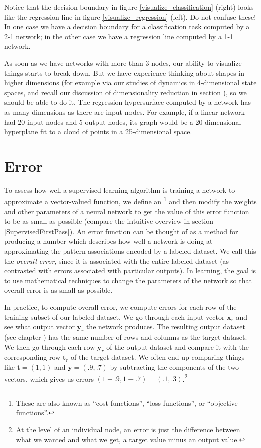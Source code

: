 Notice that the decision boundary in figure \ref{visualize_classification} (right) looks like the regression line in figure \ref{visualize_regression} (left). Do not confuse these! In one case we have a decision boundary for a classification task computed by a 2-1 network; in the other case we have a regression line computed by a 1-1 network.

As soon as we have networks with more than 3 nodes, our ability to visualize things starts to break down. But we have experience thinking about shapes in higher dimensions (for example via our studies of dynamics in 4-dimensional state spaces, and recall our discussion of dimensionality reduction in section ), so we should be able to do it. The regression hypersurface computed by a network has as many dimensions as there are input nodes. For example, if a linear network had 20 input nodes and 5 output nodes, its graph would be a 20-dimensional hyperplane fit to a cloud of points in a 25-dimensional space.


\section{Error}\label{sect_error}

To assess how well a supervised learning algorithm is training a network to approximate a vector-valued function, we  define an \footnote{These are also known as ``cost functions'', ``loss functions'', or ``objective functions''.} and then modify the weights and other parameters of a neural network to get the value of this error function to be as small as possible (compare the intuitive overview in section \ref{SupervisedFirstPass}). An error function can be thought of as a method for producing a number which describes how well a network is doing at approximating the pattern-associations encoded by a labeled dataset. We call this the \emph{overall error}, since it is associated with the entire labeled dataset (as contrasted with errors associated with particular outputs). In learning, the goal is to use mathematical techniques to change the parameters of the network so that overall error is as small as possible.

In practice, to compute overall error, we compute errors for each row of the training subset of our labeled dataset. We go through each input vector $\mathbf{x}_r$ and see what output vector $\mathbf{y}_r$ the network produces. The resulting output dataset (see chapter ) has the same number of rows and columns as the target dataset. We then go through each row $\mathbf{y}_r$ of the output dataset and compare it with the corresponding row $\mathbf{t}_r$ of the target dataset. We often end up comparing things like $\mathbf{t}  =  (1,1)$ and $\mathbf{y}  =  (.9,.7)$ by subtracting the components of the two vectors, which gives us  errors $(1-.9,1-.7) = (.1,.3)$.\footnote{At the level of an individual node, an error is just the difference between what we wanted and what we get, a target value minus an output value.}

